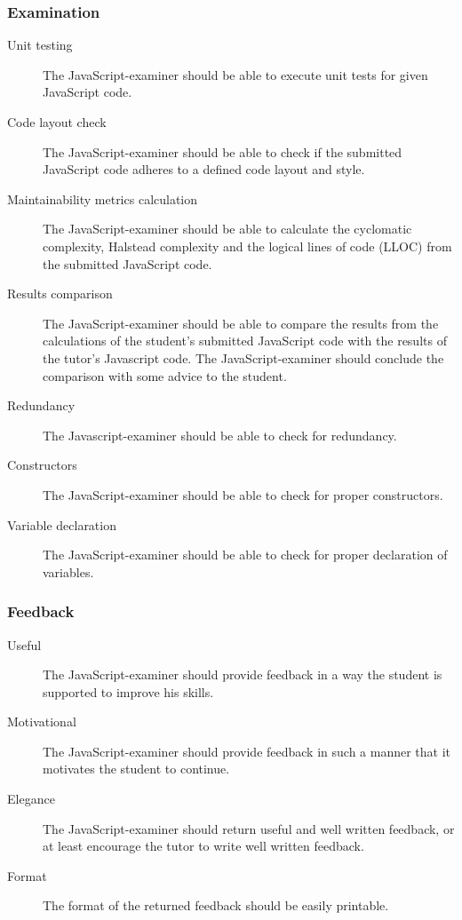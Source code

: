 \documentclass{article}
\begin{document}
\subsubsection{Examination}
\begin{description}
  \item[Unit testing] The JavaScript-examiner should be able to execute unit 
    tests for given JavaScript code.
  \item[Code layout check] The JavaScript-examiner should be able to check if 
    the submitted JavaScript code adheres to a defined code layout and style.
  \item[Maintainability metrics calculation] The JavaScript-examiner should be 
    able to calculate the cyclomatic complexity, Halstead complexity and the 
    logical lines of code (LLOC) from the submitted JavaScript code.
  \item[Results comparison] The JavaScript-examiner should be able to compare
    the results from the calculations of the student's submitted JavaScript
    code with the results of the tutor's Javascript code. The
    JavaScript-examiner should conclude the comparison with some advice to the
    student.
  \item[Redundancy] The Javascript-examiner should be able to check for
    redundancy.
  \item[Constructors] The JavaScript-examiner should be able to check for
    proper constructors.
  \item[Variable declaration] The JavaScript-examiner should be able to check
    for proper declaration of variables.
\end{description}

\subsubsection{Feedback}
\begin{description}
  \item[Useful] The JavaScript-examiner should provide feedback in a way
    the student is supported to improve his skills.
  \item[Motivational] The JavaScript-examiner should provide feedback in such a
    manner that it motivates the student to continue.
  \item[Elegance] The JavaScript-examiner should return useful and well written 
    feedback, or at least encourage the tutor to write well written feedback.
  \item[Format] The format of the returned feedback should be easily printable.
\end{description}
\end{document}
